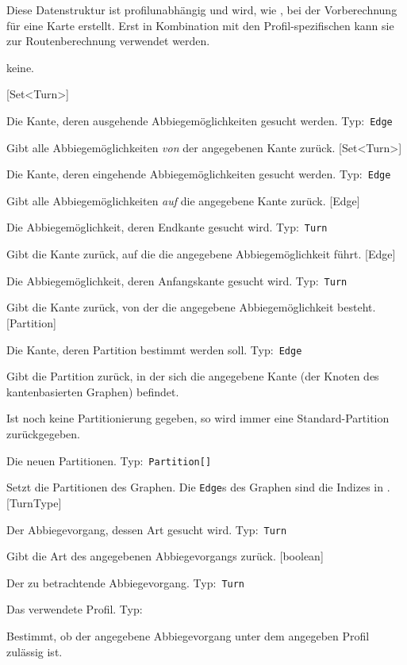 \documentclass[a4paper, 11pt]{article}
\makeatletter
\def\namedlabel#1#2{\begingroup
    #2%
    \def\@currentlabel{#2}%
    \phantomsection\label{#1}\endgroup
}
\newcommand{\none}[0]{
  \item[] keine.
}
\newcommand{\currentmethod}[0]{#1}
\let\currentmethod=\undefined
\newcommand{\param}[3]{
  \item[\namedlabel{P:\currentclass.\currentmethod.#1}{\code{#1}}] #3 Typ:~\code{#2}
}
\newcommand{\code}[1]{\texttt{#1}}
\makeatother
\begin{document}
{{          Diese Datenstruktur ist profilunabhängig und wird, wie , bei der Vorberechnung für eine Karte erstellt.
          Erst in Kombination mit den Profil-spezifischen  kann sie zur Routenberechnung verwendet werden.
        }
        {\none}
        {
          [Set<Turn>]
                 {
                   \param{edge}{Edge}{Die Kante, deren ausgehende Abbiegemöglichkeiten gesucht werden.}
                 }
                 {Gibt alle Abbiegemöglichkeiten \emph{von} der angegebenen Kante zurück.}
          [Set<Turn>]
                 {
                   \param{edge}{Edge}{Die Kante, deren eingehende Abbiegemöglichkeiten gesucht werden.}
                 }
                 {Gibt alle Abbiegemöglichkeiten \emph{auf} die angegebene Kante zurück.}
          [Edge]
                 {
                   \param{turn}{Turn}{Die Abbiegemöglichkeit, deren Endkante gesucht wird.}
                 }
                 {Gibt die Kante zurück, auf die die angegebene Abbiegemöglichkeit führt.}
          [Edge]
                 {
                   \param{turn}{Turn}{Die Abbiegemöglichkeit, deren Anfangskante gesucht wird.}
                 }
                 {Gibt die Kante zurück, von der die angegebene Abbiegemöglichkeit besteht.}
          [Partition]
                 {
                   \param{edge}{Edge}{Die Kante, deren Partition bestimmt werden soll.}
                 }
                 {
                   Gibt die Partition zurück, in der sich die angegebene Kante (der Knoten des kantenbasierten Graphen) befindet.
                   
                   Ist noch keine Partitionierung gegeben, so wird immer eine Standard-Partition zurückgegeben.
                 }
                 {
                   \param{partitions}{Partition[]}{Die neuen Partitionen.}
                 }
                 {
                   Setzt die Partitionen des Graphen. Die \code{Edge}s des Graphen sind die Indizes in .
                 }
          [TurnType]
                 {
                   \param{turn}{Turn}{Der Abbiegevorgang, dessen Art gesucht wird.}
                 }
                 {Gibt die Art des angegebenen Abbiegevorgangs zurück.}
          [boolean]
                 {
                   \param{turn}{Turn}{Der zu betrachtende Abbiegevorgang.}
                   \param{profile}{}{Das verwendete Profil.}
                 }
                 {Bestimmt, ob der angegebene Abbiegevorgang unter dem angegeben Profil zulässig ist.}
        }
}
\end{document}
